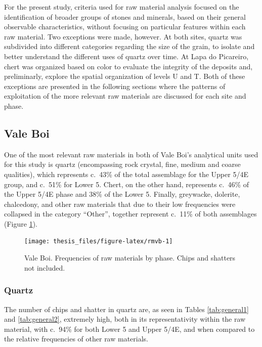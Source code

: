\documentclass[12pt,twoside]{reedthesis}
\begin{document}
For the present study, criteria used for raw material analysis focused on the identification of broader groups of stones and minerals, based on their general observable characteristics, without focusing on particular features within each raw material. Two exceptions were made, however. At both sites, quartz was subdivided into different categories regarding the size of the grain, to isolate and better understand the different uses of quartz over time. At Lapa do Picareiro, chert was organized based on color to evaluate the integrity of the deposits and, preliminarly, explore the spatial organization of levels U and T. Both of these exceptions are presented in the following sections where the patterns of exploitation of the more relevant raw materials are discussed for each site and phase.

\hypertarget{vale-boi-3}{%
\subsection{Vale Boi}\label{vale-boi-3}}

One of the most relevant raw materials in both of Vale Boi's analytical units used for this study is quartz (encompassing rock crystal, fine, medium and coarse qualities), which represents c.~43\% of the total assemblage for the Upper 5/4E group, and c.~51\% for Lower 5. Chert, on the other hand, represents c.~46\% of the Upper 5/4E phase and 38\% of the Lower 5. Finally, greywacke, dolerite, chalcedony, and other raw materials that due to their low frequencies were collapsed in the category ``Other'', together represent c.~11\% of both assemblages (Figure \ref{fig:rmvb}).
\begin{figure}

{\centering \texttt{[image: thesis\_files/figure-latex/rmvb-1]} 

}

\caption{Vale Boi. Frequencies of raw materials by phase. Chips and shatters not included.}\label{fig:rmvb}
\end{figure}
\hypertarget{quartz}{%
\subsubsection{Quartz}\label{quartz}}

The number of chips and shatter in quartz are, as seen in Tables \ref{tab:general1} and \ref{tab:general2}, extremely high, both in its representativity within the raw material, with c.~94\% for both Lower 5 and Upper 5/4E, and when compared to the relative frequencies of other raw materials.
\end{document}
